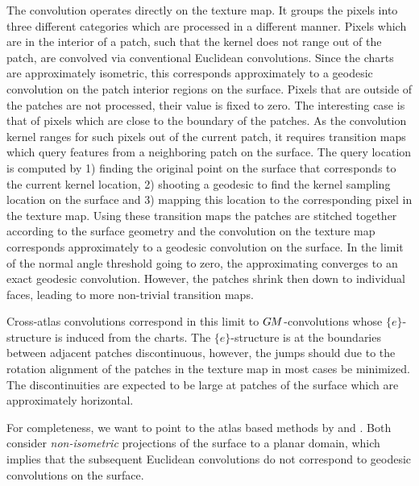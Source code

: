 The convolution operates directly on the texture map.
It groups the pixels into three different categories which are processed in a different manner.
Pixels which are in the interior of a patch, such that the kernel does not range out of the patch, are convolved via conventional Euclidean convolutions.
Since the charts are approximately isometric, this corresponds approximately to a geodesic convolution on the patch interior regions on the surface.
Pixels that are outside of the patches are not processed, their value is fixed to zero.
The interesting case is that of pixels which are close to the boundary of the patches.
As the convolution kernel ranges for such pixels out of the current patch, it requires transition maps which query features from a neighboring patch on the surface.
The query location is computed by
1) finding the original point on the surface that corresponds to the current kernel location,
2) shooting a geodesic to find the kernel sampling location on the surface and
3) mapping this location to the corresponding pixel in the texture map.
Using these transition maps the patches are stitched together according to the surface geometry and the convolution on the texture map corresponds approximately to a geodesic convolution on the surface.
In the limit of the normal angle threshold going to zero, the approximating converges to an exact geodesic convolution.
However, the patches shrink then down to individual faces, leading to more non-trivial transition maps.

Cross-atlas convolutions correspond in this limit to $G\mkern-1.4muM$-convolutions whose $\{e\}$-structure is induced from the charts.
The $\{e\}$-structure is at the boundaries between adjacent patches discontinuous, however, the jumps should due to the rotation alignment of the patches in the texture map in most cases be minimized.
The discontinuities are expected to be large at patches of the surface which are approximately horizontal.

For completeness, we want to point to the atlas based methods by \citet{sinha2016deep} and \citet{maron2017convolutional}.
Both consider \emph{non-isometric} projections of the surface to a planar domain, which implies that the subsequent Euclidean convolutions do not correspond to geodesic convolutions on the surface.
